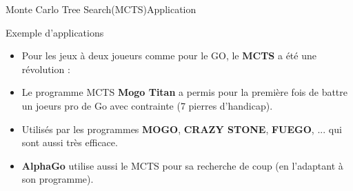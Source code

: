 \begin{frame}{Monte Carlo Tree Search(MCTS)}{Application}
	\begin{block}{Exemple d'applications}
		\begin{itemize}
			\item Pour les jeux à deux joueurs comme pour le GO, le \textbf{MCTS} a été une révolution :
			\item Le programme MCTS \textbf{Mogo Titan} a permis pour la première fois de battre un joeurs pro de Go avec contrainte (7 pierres d'handicap).
			\item Utilisés par les programmes \textbf{MOGO}, \textbf{CRAZY STONE}, \textbf{FUEGO}, ... qui sont aussi très efficace.
			\item \textbf{AlphaGo} utilise aussi le MCTS pour sa recherche de coup (en l'adaptant à son programme).
			
		\end{itemize}
	\end{block}
\end{frame}